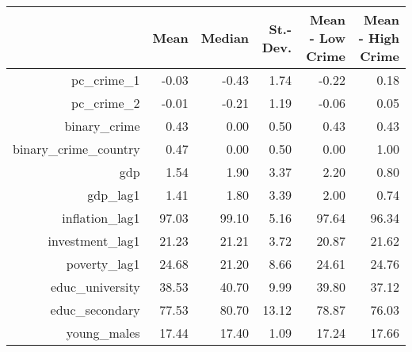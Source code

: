 \begin{table}[ht]
\centering
\begin{tabular}{rrrrrr}
  \hline
 & Mean & Median & St.-Dev. & Mean - Low Crime & Mean - High Crime \\ 
  \hline
pc\_crime\_1 & -0.03 & -0.43 & 1.74 & -0.22 & 0.18 \\ 
  pc\_crime\_2 & -0.01 & -0.21 & 1.19 & -0.06 & 0.05 \\ 
  binary\_crime & 0.43 & 0.00 & 0.50 & 0.43 & 0.43 \\ 
  binary\_crime\_country & 0.47 & 0.00 & 0.50 & 0.00 & 1.00 \\ 
  gdp & 1.54 & 1.90 & 3.37 & 2.20 & 0.80 \\ 
  gdp\_lag1 & 1.41 & 1.80 & 3.39 & 2.00 & 0.74 \\ 
  inflation\_lag1 & 97.03 & 99.10 & 5.16 & 97.64 & 96.34 \\ 
  investment\_lag1 & 21.23 & 21.21 & 3.72 & 20.87 & 21.62 \\ 
  poverty\_lag1 & 24.68 & 21.20 & 8.66 & 24.61 & 24.76 \\ 
  educ\_university & 38.53 & 40.70 & 9.99 & 39.80 & 37.12 \\ 
  educ\_secondary & 77.53 & 80.70 & 13.12 & 78.87 & 76.03 \\ 
  young\_males & 17.44 & 17.40 & 1.09 & 17.24 & 17.66 \\ 
   \hline
\end{tabular}
\end{table}
